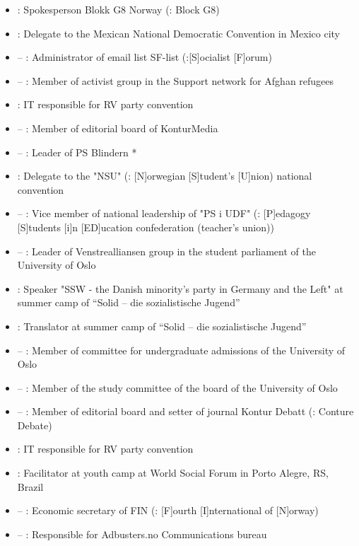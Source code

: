 \begin{itemize}
\item {}: Spokesperson Blokk G8 Norway (\english: Block G8)
\item {}: Delegate to the Mexican National Democratic Convention in Mexico city
\item {} – : Administrator of email list SF-list (\english:[S]ocialist [F]orum)
\item {} – : Member of activist group in the Support network for Afghan refugees
\item {}: IT responsible for RV party convention
\item {} – : Member of editorial board of KonturMedia
\item {} – : Leader of PS Blindern *
\item {}: Delegate to the "NSU" (\english: [N]orwegian [S]tudent's [U]nion) national convention
\item {} – : Vice member of national leadership of "PS i UDF" (\english: [P]edagogy [S]tudents [i]n [ED]ucation confederation (teacher's union))
\item {} – : Leader of Venstrealliansen group in the student parliament of the University of Oslo
\item {}: Speaker "SSW - the Danish minority's party in Germany and the Left" at summer camp of “Solid – die sozialistische Jugend”
\item {}: Translator at summer camp of “Solid – die sozialistische Jugend”
\item {} – : Member of committee for undergraduate admissions of the University of Oslo
\item {} – : Member of the study committee of the board of the University of Oslo
\item {} – : Member of editorial board and setter of journal Kontur Debatt (\english: Conture Debate)
\item {}: IT responsible for RV party convention
\item {}: Facilitator at youth camp at World Social Forum in Porto Alegre, RS, Brazil
\item {} – : Economic secretary of FIN (\english: [F]ourth [I]nternational of [N]orway)
\item {} – : Responsible for Adbusters.no Communications bureau

\end{itemize}
